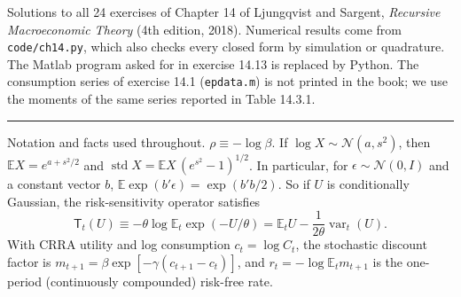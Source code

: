 \documentclass[11pt,letterpaper,reqno]{amsart}
\newcommand{\E}{\mathbb{E}}                 %
\newcommand{\Norm}{\mathcal{N}}             %
\DeclareMathOperator{\var}{var}
\begin{document}
\begin{center}
\begin{minipage}{0.86\textwidth}
\small
Solutions to all 24 exercises of Chapter 14 of Ljungqvist and Sargent, \emph{Recursive Macroeconomic Theory} (4th edition, 2018).
Numerical results come from \texttt{code/ch14.py}, which also checks every closed form by simulation or quadrature.  The Matlab program asked for in
exercise 14.13 is replaced by Python.  The consumption series of exercise 14.1 (\texttt{epdata.m}) is not printed in the book; we use the moments of the
same series reported in Table 14.3.1.
\end{minipage}
\end{center}

\bigskip
\hrule
\bigskip

Notation and facts used throughout.  $\rho\equiv-\log\beta$.  If $\log X\sim\Norm(a,s^2)$, then $\E X=e^{a+s^2/2}$ and $\operatorname{std}X=\E X\,(e^{s^2}-1)^{1/2}$.  In
particular, for $\epsilon\sim\Norm(0,I)$ and a constant vector $b$, $\E\exp(b'\epsilon)=\exp(b'b/2)$.  So if $U$ is conditionally Gaussian, the risk-sensitivity
operator satisfies
\[
  \mathsf T_t(U)\equiv-\theta\log\E_t\exp(-U/\theta)=\E_tU-\frac1{2\theta}\var_t(U).
\]
With CRRA utility and log consumption $c_t=\log C_t$, the stochastic discount factor is $m_{t+1}=\beta\exp[-\gamma(c_{t+1}-c_t)]$, and $r_t=-\log\E_tm_{t+1}$ is the
one-period (continuously compounded) risk-free rate.
\end{document}
